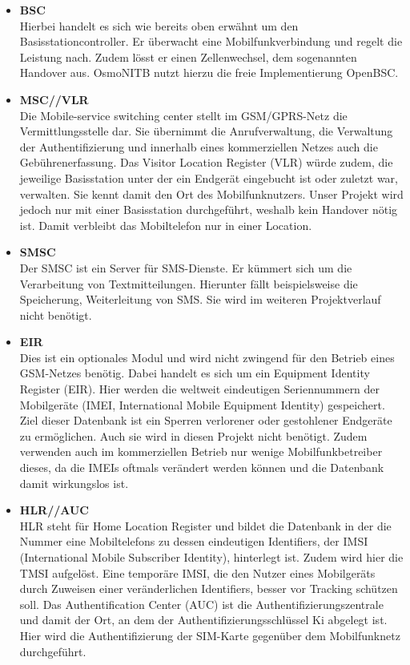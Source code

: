 \begin{itemize}

\item \textbf{BSC}\\
Hierbei handelt es sich wie bereits oben erwähnt um den Basisstationcontroller. Er überwacht eine Mobilfunkverbindung und regelt die Leistung nach. Zudem lösst er einen Zellenwechsel, dem sogenannten Handover aus. OsmoNITB nutzt hierzu die freie Implementierung OpenBSC.  

 
\item \textbf{MSC//VLR}\\
Die Mobile-service switching center stellt im GSM/GPRS-Netz die Vermittlungsstelle dar. Sie übernimmt die Anrufverwaltung, die Verwaltung der Authentifizierung und innerhalb eines kommerziellen Netzes auch die Gebührenerfassung. Das Visitor Location Register (VLR) würde zudem, die jeweilige Basisstation unter der ein Endgerät eingebucht ist oder zuletzt war, verwalten. Sie kennt damit den Ort des Mobilfunknutzers. Unser Projekt wird jedoch nur mit einer Basisstation durchgeführt, weshalb kein Handover nötig ist. Damit verbleibt das Mobiltelefon nur in einer Location. 


\item \textbf{SMSC}\\
Der SMSC ist ein Server für SMS-Dienste. Er kümmert sich um die Verarbeitung von Textmitteilungen. Hierunter fällt beispielsweise die Speicherung, Weiterleitung von SMS. Sie wird im weiteren Projektverlauf nicht benötigt.


\item \textbf{EIR}\\
Dies ist ein optionales Modul und wird nicht zwingend für den Betrieb eines GSM-Netzes benötig. Dabei handelt es sich um ein Equipment Identity Register (EIR). Hier werden die weltweit eindeutigen Seriennummern der Mobilgeräte (IMEI, International Mobile Equipment Identity) gespeichert. Ziel dieser Datenbank ist ein Sperren verlorener oder gestohlener Endgeräte zu ermöglichen. Auch sie wird in diesen Projekt nicht benötigt. Zudem verwenden auch im kommerziellen Betrieb nur wenige Mobilfunkbetreiber dieses, da die IMEIs oftmals verändert werden können und die Datenbank damit wirkungslos ist.  


\item \textbf{HLR//AUC}\\
HLR steht für Home Location Register und bildet die Datenbank in der die Nummer eine Mobiltelefons zu dessen eindeutigen Identifiers, der IMSI (International Mobile Subscriber Identity), hinterlegt ist. Zudem wird hier die TMSI aufgelöst. Eine temporäre IMSI, die den Nutzer eines Mobilgeräts durch Zuweisen einer veränderlichen Identifiers, besser vor Tracking schützen soll. Das Authentification Center (AUC) ist die Authentifizierungszentrale und damit der Ort, an dem der Authentifizierungsschlüssel Ki abgelegt ist. Hier wird die Authentifizierung der SIM-Karte gegenüber dem Mobilfunknetz durchgeführt. 


\end{itemize}


